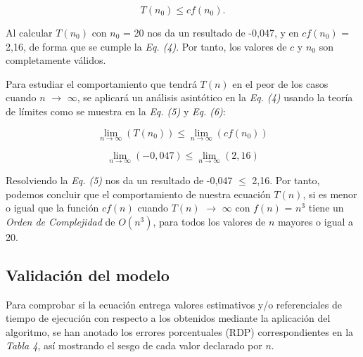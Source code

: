 \documentclass[11pt, twocolumn]{llncs}
\begin{document}
\begin{equation}
T(n_{0}) \leq cf(n_{0}).
\end{equation}

Al calcular $T(n_{0})$ con $n_{0}$ = 20 nos da un resultado de
-0,047, y en $cf(n_{0})$ = 2,16, de forma que se cumple la \textit{Eq. (4)}. Por tanto, los valores de $c$ y $n_0$ son completamente válidos.

Para estudiar el comportamiento que tendrá $T(n)$ en el peor de los casos cuando $n$ $\longrightarrow$ $\infty$, se aplicará un análisis asintótico en la \textit{Eq. (4)} usando la teoría de límites como se muestra en la \textit{Eq. (5)} y \textit{Eq. (6)}:

\begin{equation}
\lim_{n\rightarrow\infty}(T(n_{0})) \leq \lim_{n\rightarrow\infty}(cf(n_{0}))
\end{equation}

\begin{equation}
\lim_{n\rightarrow\infty}(-0,047) \leq \lim_{n\rightarrow\infty}(2,16)
\end{equation}

Resolviendo la \textit{Eq. (5)} nos da un resultado de -0,047 $\leq$ 2,16. Por tanto, podemos concluir que el comportamiento de nuestra ecuación $T(n)$, si es menor o igual que la función $cf(n)$ cuando $T(n)$ $\rightarrow$ $\infty$ con $f(n)$ = $n^{3}$ tiene un \textit{Orden de Complejidad} de $O(n^{3})$, para todos los valores de $n$ mayores o igual a 20.

\subsection{Validación del modelo}

Para comprobar si la ecuación entrega valores estimativos y/o referenciales de tiempo de ejecución con respecto a los obtenidos mediante la aplicación del algoritmo, se han anotado los errores porcentuales (RDP) correspondientes en la \textit{Tabla 4}, así mostrando el sesgo de cada valor declarado por $n$.
\end{document}

